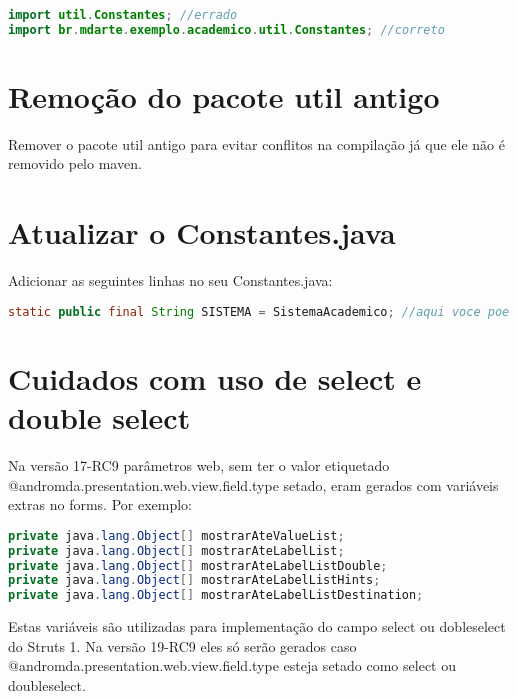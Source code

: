 \begin{framed}
\begin{lstlisting}[language=java, breaklines=true]
import util.Constantes; //errado
import br.mdarte.exemplo.academico.util.Constantes; //correto
\end{lstlisting}
\end{framed}

\section{Remoção do pacote util antigo}
Remover o pacote util antigo para evitar conflitos na compilação já que ele não
é removido pelo maven.

\section{Atualizar o Constantes.java}
Adicionar as seguintes linhas no seu Constantes.java:

\begin{framed}
\begin{lstlisting}[language=java]
static public final String SISTEMA = SistemaAcademico; //aqui voce poe o valor do atributo application.id do build.properties do projeto static public final Integer TABLE\_LINES = 20; static public final Integer TABLE_PAGES = 10;
\end{lstlisting}
\end{framed}

\section{Cuidados com uso de select e double select}
Na versão 17-RC9 parâmetros web, sem ter o valor etiquetado
@andromda.presentation.web.view.field.type setado, eram gerados com variáveis extras no forms. Por exemplo:

\begin{framed}
\begin{lstlisting}[language=java]
private java.lang.Object[] mostrarAteValueList;
private java.lang.Object[] mostrarAteLabelList;
private java.lang.Object[] mostrarAteLabelListDouble;
private java.lang.Object[] mostrarAteLabelListHints;
private java.lang.Object[] mostrarAteLabelListDestination;
\end{lstlisting}
\end{framed}

Estas variáveis são utilizadas para implementação do campo select ou dobleselect
do Struts 1. Na versão 19-RC9 eles só serão gerados caso @andromda.presentation.web.view.field.type esteja setado como select ou doubleselect. 

